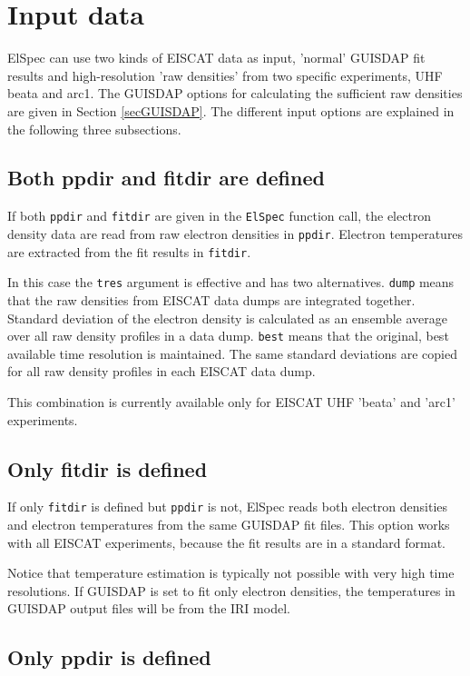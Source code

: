 \documentclass[12pt,a4paper]{report}
\begin{document}
\section{Input data}

ElSpec can use two kinds of EISCAT data as input, 'normal' GUISDAP fit results and high-resolution 'raw densities' from two specific experiments, UHF beata and arc1.  The GUISDAP options for calculating the sufficient raw densities are given in Section \ref{secGUISDAP}. The different input options are explained in the following three subsections. 

\subsection{Both ppdir and fitdir are defined}

If both \verb|ppdir| and \verb|fitdir| are given in the \verb|ElSpec| function call, the electron density data are read from raw electron densities in \verb|ppdir|. Electron temperatures are extracted from the fit results in  \verb|fitdir|. 

In this case the \verb|tres| argument is effective and has two alternatives. \verb|dump| means that the raw densities from EISCAT data dumps are integrated together. Standard deviation of the electron density is calculated as an ensemble average over all raw density profiles in a data dump. \verb|best| means that the original, best available time resolution is maintained. The same standard deviations are copied for all raw density profiles in each EISCAT data dump. 

This combination is currently available only for EISCAT UHF 'beata' and 'arc1' experiments. 

\subsection{Only fitdir is defined}

If only \verb|fitdir| is defined but \verb|ppdir| is not, ElSpec reads both electron densities and electron temperatures from the same GUISDAP fit files. This option works with all EISCAT experiments, because the fit results are in a standard format. 

Notice that temperature estimation is typically not possible with very high time resolutions. If GUISDAP is set to fit only electron densities, the temperatures in GUISDAP output files will be from the IRI model. 


\subsection{Only ppdir is defined}
\end{document}
